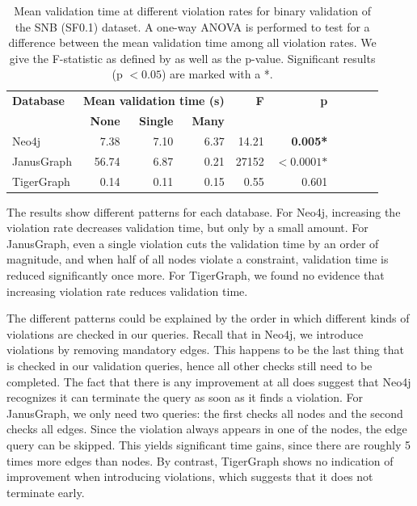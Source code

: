 \documentclass{report}
\theoremstyle{definition}
\begin{document}
\begin{table}[t]
  \centering
  \begin{tabular}{lrrrrrrrrr}
    \hline
    \textbf{Database} & \multicolumn{3}{c}{\textbf{Mean validation time (s)}} & \textbf{F}      & \textbf{p}                                           \\
                      & \textbf{None}                                         & \textbf{Single} & \textbf{Many} &                                      \\
    \hline
    Neo4j             & 7.38                                                  & 7.10            & 6.37          & 14.21 & \textbf{0.005*}              \\
    JanusGraph        & 56.74                                                 & 6.87            & 0.21          & 27152 & $\mathbf{<0.0001}\textbf{*}$ \\
    TigerGraph        & 0.14                                                  & 0.11            & 0.15          & 0.55  & 0.601                        \\
    \hline
  \end{tabular}
  \caption[Mean validation time at different violation rates]{Mean validation time at different violation rates for binary validation of the SNB (SF0.1) dataset. A one-way ANOVA is performed to test for a difference between the mean validation time among all violation rates. We give the F-statistic as defined by \citet{snedecor1989statistical} as well as the p-value. Significant results (p $< 0.05$) are marked with a *.}
  \label{tab:results-violations}
\end{table}

The results show different patterns for each database. For Neo4j, increasing the violation rate decreases validation time, but only by a small amount. For JanusGraph, even a single violation cuts the validation time by an order of magnitude, and when half of all nodes violate a constraint, validation time is reduced significantly once more. For TigerGraph, we found no evidence that increasing violation rate reduces validation time.

The different patterns could be explained by the order in which different kinds of violations are checked in our queries. Recall that in Neo4j, we introduce violations by removing mandatory edges. This happens to be the last thing that is checked in our validation queries, hence all other checks still need to be completed. The fact that there is any improvement at all does suggest that Neo4j recognizes it can terminate the query as soon as it finds a violation. For JanusGraph, we only need two queries: the first checks all nodes and the second checks all edges. Since the violation always appears in one of the nodes, the edge query can be skipped. This yields significant time gains, since there are roughly 5 times more edges than nodes. By contrast, TigerGraph shows no indication of improvement when introducing violations, which suggests that it does not terminate early.
\end{document}
